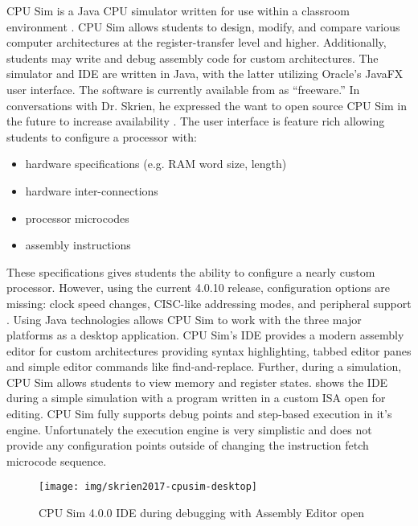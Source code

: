 CPU Sim is a Java CPU simulator written for use within a classroom environment \cite{Skrien2001}. CPU Sim allows students to design, modify, and compare various computer architectures at the register-transfer level and higher. Additionally, students may write and debug assembly code for custom architectures. The simulator and IDE are written in Java, with the latter utilizing Oracle's JavaFX user interface. The software is currently available from \cite{Skrien2017} as ``freeware.'' In conversations with Dr. Skrien, he expressed the want to open source CPU Sim in the future to increase availability \cite{Skrien2016}. The user interface is feature rich allowing students to configure a processor with:
\begin{itemize}
    \item hardware specifications (e.g. RAM word size, length)
    \item hardware inter-connections
    \item processor microcodes
    \item assembly instructions
\end{itemize} 
These specifications gives students the ability to configure a nearly custom processor. However, using the current 4.0.10 release, configuration options are missing: clock speed changes, CISC-like addressing modes, and peripheral support
\cite{Skrien2017}. Using Java technologies allows CPU Sim to work with the three major platforms as a desktop application. CPU Sim's IDE provides a modern assembly editor for custom architectures providing syntax highlighting, tabbed editor panes and simple editor commands like find-and-replace. Further, during a simulation, CPU Sim allows students to view memory and register states.  shows the IDE during a simple simulation with a program written in a custom ISA open for editing. CPU Sim fully supports debug points and step-based execution in it's engine. Unfortunately the execution engine is very simplistic and does not provide any configuration points outside of changing the instruction fetch microcode sequence. 

\begin{figure}[t!]
    \centering
    \texttt{[image: img/skrien2017-cpusim-desktop]}
    \caption{CPU Sim 4.0.0 IDE during debugging with Assembly Editor open \cite{Skrien2017}}
    \label{fig:skrien2017-cpusim-desktop}
\end{figure}

